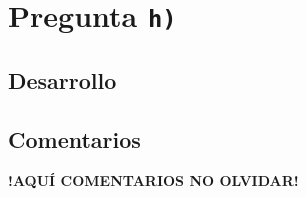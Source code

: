 \section{Pregunta \texttt{h)}}\label{pregunta-h}


\subsection{Desarrollo}

\FloatBarrier
\subsection{Comentarios}


\textbf{!AQUÍ COMENTARIOS NO OLVIDAR!}